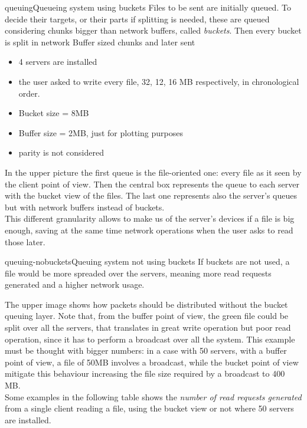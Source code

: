 \begin{myimage}{queuing}{Queueing system using buckets}
    Files to be sent are initially queued. To decide their targets, or
    their parts if splitting is needed, these are queued considering
    chunks bigger than network buffers, called \textit{buckets}. Then every
    bucket is split in network Buffer sized chunks and later sent
\end{myimage}
\begin{itemize}
    \item 4 servers are installed
    \item the user asked to write every file, 32, 12, 16 MB respectively, in
        chronological order.
    \item Bucket size = 8MB
    \item Buffer size = 2MB, just for plotting purposes
    \item parity is not considered
\end{itemize}
In the upper picture the first queue is the file-oriented one: every file as it seen
by the client point of view.  Then the central box represents the queue to each
server with the bucket view of the files.  The last one represents also the
server's queues but with network buffers instead of buckets. \\ This different
granularity allows to make us of the server's devices if a file is big enough,
saving at the same time network operations when the user asks to read those
later.\\
\begin{myimage}{queuing-nobuckets}{Queuing system not using buckets}
    If buckets are not used, a file would be more spreaded over the servers,
    meaning more read requests generated and a higher network usage.
\end{myimage}
The upper image shows how packets should be distributed without the bucket queuing layer.
Note that, from the buffer point of view, the green file could be
split over all the servers, that translates in great write operation but poor
read operation, since it has to perform a broadcast over all the system. This
example must be thought with bigger numbers: in a case with 50 servers, with a
buffer point of view, a file of 50MB involves a broadcast, while the bucket
point of view mitigate this behaviour increasing the file size required by a
broadcast to 400 MB. \\
Some examples in the following table shows the \textit{number of read requests generated}
from a single client reading a file, using the bucket view or not where 50 servers are installed.

